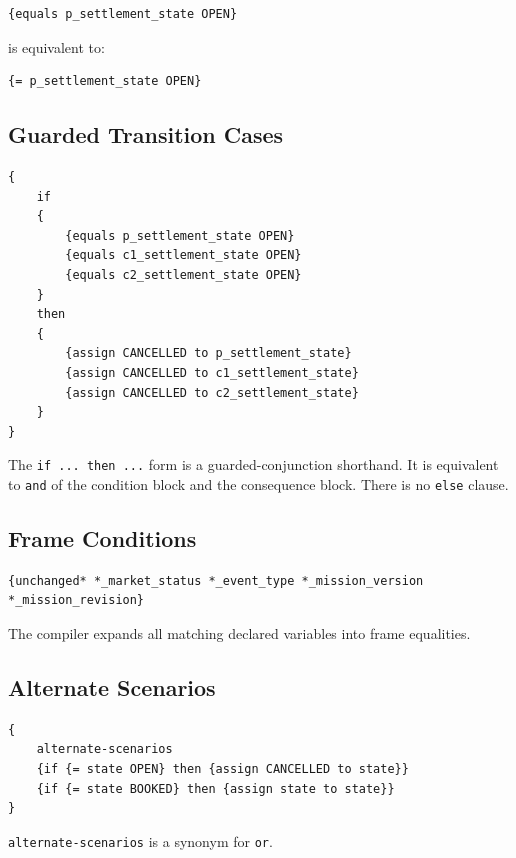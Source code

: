 \documentclass[11pt]{article}
\begin{document}
\begin{lstlisting}[language=TDSTR]
{equals p_settlement_state OPEN}
\end{lstlisting}

is equivalent to:

\begin{lstlisting}[language=TDSTR]
{= p_settlement_state OPEN}
\end{lstlisting}

\subsection{Guarded Transition Cases}

\begin{lstlisting}[language=TDSTR]
{
    if
    {
        {equals p_settlement_state OPEN}
        {equals c1_settlement_state OPEN}
        {equals c2_settlement_state OPEN}
    }
    then
    {
        {assign CANCELLED to p_settlement_state}
        {assign CANCELLED to c1_settlement_state}
        {assign CANCELLED to c2_settlement_state}
    }
}
\end{lstlisting}

The \texttt{if ... then ...} form is a guarded-conjunction shorthand.  It is
equivalent to \texttt{and} of the condition block and the consequence block.
There is no \texttt{else} clause.

\subsection{Frame Conditions}

\begin{lstlisting}[language=TDSTR]
{unchanged* *_market_status *_event_type *_mission_version *_mission_revision}
\end{lstlisting}

The compiler expands all matching declared variables into frame equalities.

\subsection{Alternate Scenarios}

\begin{lstlisting}[language=TDSTR]
{
    alternate-scenarios
    {if {= state OPEN} then {assign CANCELLED to state}}
    {if {= state BOOKED} then {assign state to state}}
}
\end{lstlisting}

\texttt{alternate-scenarios} is a synonym for \texttt{or}.
\end{document}
